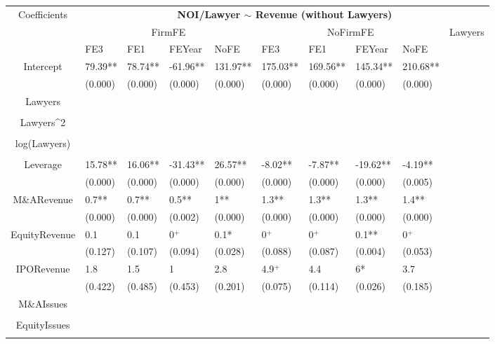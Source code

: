 \documentclass{article}
\begin{document}
\begin{table}[H]
\centering
\begin{tabular}{|clllllllll|}
\hline
\multirow{3}{*}{Coefficients} & \multicolumn{9}{c|}{\textbf{NOI/Lawyer $\sim$ Revenue (without Lawyers)}} \\
\cline{2-10}
& \multicolumn{4}{c}{FirmFE} & \multicolumn{4}{c}{NoFirmFE} & \multirow{2}{*}{Lawyers} \\
\cline{2-9}
& FE3 & FE1 & FEYear & NoFE & FE3 & FE1 & FEYear & NoFE &  \\
\hline
 
Intercept & 79.39** & 78.74** & -61.96** & 131.97** & 175.03** & 169.56** & 145.34** & 210.68** & \\ 
   & (0.000) & (0.000) & (0.000) & (0.000) & (0.000) & (0.000) & (0.000) & (0.000) & \\ 
  Lawyers &  &  &  &  &  &  &  &  & \\ 
   &  &  &  &  &  &  &  &  & \\ 
  Lawyers^2 &  &  &  &  &  &  &  &  & \\ 
   &  &  &  &  &  &  &  &  & \\ 
  log(Lawyers) &  &  &  &  &  &  &  &  & \\ 
   &  &  &  &  &  &  &  &  & \\ 
  Leverage & 15.78** & 16.06** & -31.43** & 26.57** & -8.02** & -7.87** & -19.62** & -4.19** & \\ 
   & (0.000) & (0.000) & (0.000) & (0.000) & (0.000) & (0.000) & (0.000) & (0.005) & \\ 
  M\&ARevenue & 0.7** & 0.7** & 0.5** & 1** & 1.3** & 1.3** & 1.3** & 1.4** & \\ 
   & (0.000) & (0.000) & (0.002) & (0.000) & (0.000) & (0.000) & (0.000) & (0.000) & \\ 
  EquityRevenue & 0.1 & 0.1 & 0$^{+}$ & 0.1* & 0$^{+}$ & 0$^{+}$ & 0.1** & 0$^{+}$ & \\ 
   & (0.127) & (0.107) & (0.094) & (0.028) & (0.088) & (0.087) & (0.004) & (0.053) & \\ 
  IPORevenue & 1.8 & 1.5 & 1 & 2.8 & 4.9$^{+}$ & 4.4 & 6* & 3.7 & \\ 
   & (0.422) & (0.485) & (0.453) & (0.201) & (0.075) & (0.114) & (0.026) & (0.185) & \\ 
  M\&AIssues &  &  &  &  &  &  &  &  & \\ 
   &  &  &  &  &  &  &  &  & \\ 
  EquityIssues &  &  &  &  &  &  &  &  & \\ 
   &  &  &  &  &  &  &  &  & \\ 

\end{tabular}
\end{table}
\end{document}
